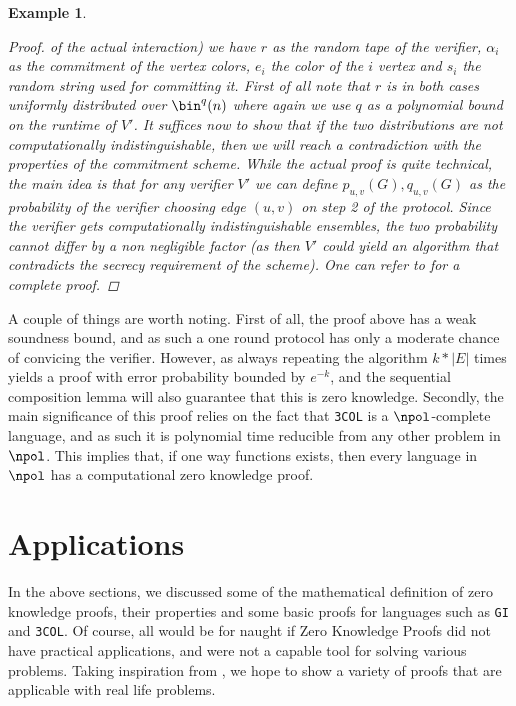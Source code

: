 \documentclass{article}
\newtheorem{example}{Example}
\begin{document}
\begin{example}
\begin{proof}
        of the actual interaction)
        we have $r$ as the random tape of the verifier, $\alpha_i$ as the commitment of the vertex colors, $e_i$ the color of the $i$ vertex and $s_i$ the
        random string used for committing it. First of all note that $r$ is in both cases uniformly distributed over $\bin^q(n)$ where again we
        use $q$ as a polynomial bound on the runtime of $V'$. It suffices now to show that if the two distributions are
        not computationally indistinguishable, then we will reach a contradiction with the properties of the commitment scheme.
        While the actual proof is quite technical, the main idea is that for any verifier $V'$ we can
        define $p_{u, v}(G), q_{u,v}(G)$ as the probability of the verifier choosing edge $(u,v)$ on step 2 of the protocol.
        Since the verifier gets computationally indistinguishable ensembles, the two probability cannot differ by a non negligible factor
        (as then $V'$ could yield an algorithm that contradicts the secrecy requirement of the scheme). One can refer to \cite{goldreichFoundationsCryptographyVol2007}
        for a complete proof.

    \end{proof}
\end{example}

A couple of things are worth noting. First of all, the proof above has a weak soundness bound, and as such
a one round protocol has only a moderate chance of convicing the verifier. However, as always repeating the
algorithm $k * |E|$ times yields a proof with error probability bounded by $e^{-k}$, and the sequential composition lemma will
also guarantee that this is zero knowledge. Secondly, the main significance of this proof relies on the fact that
\texttt{3COL} is a $\npol$-complete language, and as such it is polynomial time reducible from any other problem in $\npol$.
This implies that, if one way functions exists, then every language in $\npol$ has a computational zero knowledge proof.

\section{Applications}
\label{applications}
In the above sections, we discussed some of the mathematical definition of zero knowledge proofs, their properties and some basic
proofs for languages such as \texttt{GI} and \texttt{3COL}. Of course, all would be for naught if Zero Knowledge Proofs
did not have practical applications, and were not a capable tool for solving various problems.
Taking inspiration from \cite{moraisSurveyZeroKnowledge2019}, we hope to show a variety of proofs that
are applicable with real life problems.
\end{document}
